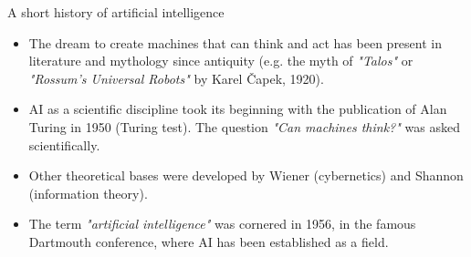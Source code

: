 \documentclass[xcolor=pdftex,dvipsnames,table]{beamer}
\begin{document}
\begin{frame}{A short history of artificial intelligence}
\begin{itemize}
	\item The dream to create machines that can think and act has been present in literature and mythology since antiquity (e.g. the myth of \emph{"Talos"} or \emph{"Rossum's Universal Robots"} by Karel \v{C}apek, 1920).
	\item AI as a scientific discipline took its beginning with the publication of Alan Turing in 1950 (Turing test). The question \emph{"Can machines think?"} was asked scientifically.
	\item Other theoretical bases were developed by Wiener (cybernetics) and Shannon (information theory).
	\item The term \emph{"artificial intelligence"} was cornered in 1956, in the famous Dartmouth conference, where AI has been established as a field.
\end{itemize}
\end{frame}
\end{document}

